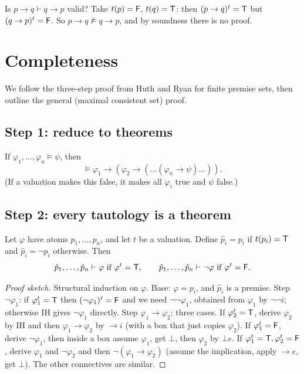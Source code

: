 \begin{example}
Is $p\to q\vdash q\to p$ valid? Take $t(p)=\mathsf{F}$, $t(q)=\mathsf{T}$: then $(p\to q)^t=\mathsf{T}$ but
$(q\to p)^t=\mathsf{F}$. So $p\to q\not\models q\to p$, and by soundness there is no proof.
\end{example}

\section{Completeness}

We follow the three-step proof from Huth and Ryan for finite premise sets, then outline
the general (maximal consistent set) proof.

\subsection*{Step 1: reduce to theorems}
If $\varphi_1,\dots,\varphi_n\models\psi$, then
\[
  \models \varphi_1\to(\varphi_2\to(\dots(\varphi_n\to\psi)\dots)).
\]
(If a valuation makes this false, it makes all $\varphi_i$ true and $\psi$ false.)

\subsection*{Step 2: every tautology is a theorem}
\begin{lemma}[Kalm\'ar]
Let $\varphi$ have atoms $p_1,\dots,p_n$, and let $t$ be a valuation. Define
$\hat p_i = p_i$ if $t(p_i)=\mathsf{T}$ and $\hat p_i=\neg p_i$ otherwise. Then
\[
  \hat p_1,\dots,\hat p_n\vdash\varphi \text{ if } \varphi^t=\mathsf{T},\qquad
  \hat p_1,\dots,\hat p_n\vdash\neg\varphi \text{ if } \varphi^t=\mathsf{F}.
\]
\end{lemma}
\begin{proof}[Proof sketch]
Structural induction on $\varphi$. Base: $\varphi=p_i$, and $\hat p_i$ is a premise. Step
$\neg\varphi_1$: if $\varphi_1^t=\mathsf{T}$ then $(\neg\varphi_1)^t=\mathsf{F}$ and we need
$\neg\neg\varphi_1$, obtained from $\varphi_1$ by $\neg\neg i$; otherwise IH gives
$\neg\varphi_1$ directly. Step $\varphi_1\to\varphi_2$: three cases. If $\varphi_2^t=\mathsf{T}$,
derive $\varphi_2$ by IH and then $\varphi_1\to\varphi_2$ by $\to i$ (with a box that just
copies $\varphi_2$). If $\varphi_1^t=\mathsf{F}$, derive $\neg\varphi_1$, then inside a box assume
$\varphi_1$, get $\bot$, then $\varphi_2$ by $\bot e$. If $\varphi_1^t=\mathsf{T},\varphi_2^t=\mathsf{F}$,
derive $\varphi_1$ and $\neg\varphi_2$ and then $\neg(\varphi_1\to\varphi_2)$ (assume the
implication, apply $\to e$, get $\bot$). The other connectives are similar.
\end{proof}

